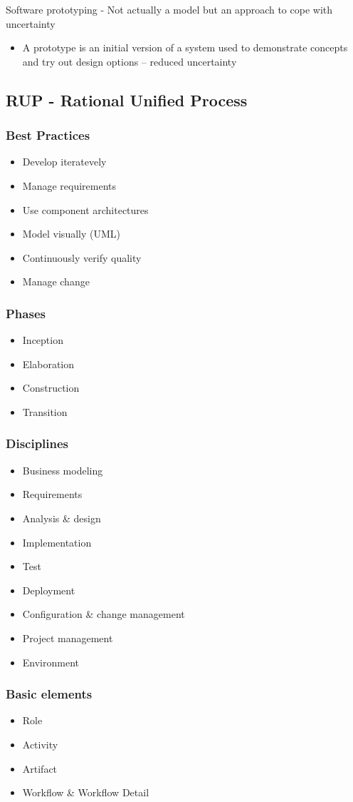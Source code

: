 \documentclass[../ESOF_notes.tex]{subfiles}
\begin{document}
Software prototyping - Not actually a model but an approach to cope with uncertainty
\begin{itemize}
    \item A prototype is an initial version of a system used to demonstrate concepts and try out design options – reduced uncertainty
\end{itemize}

\subsection{RUP - Rational Unified Process}

\subsubsection{Best Practices}
\begin{itemize}
    \item Develop iteratevely
    \item Manage requirements
    \item Use component architectures
    \item Model visually (UML)
    \item Continuously verify quality
    \item Manage change
\end{itemize}

\subsubsection{Phases}
\begin{itemize}
    \item Inception
    \item Elaboration
    \item Construction
    \item Transition
\end{itemize}

\subsubsection{Disciplines}

\begin{itemize}
    \item Business modeling
    \item Requirements
    \item Analysis \& design
    \item Implementation
    \item Test
    \item Deployment
    \item Configuration \& change management
    \item Project management
    \item Environment
\end{itemize}

\subsubsection{Basic elements}
\begin{itemize}
    \item Role
    \item Activity
    \item Artifact
    \item Workflow \& Workflow Detail
\end{itemize}
\end{document}
